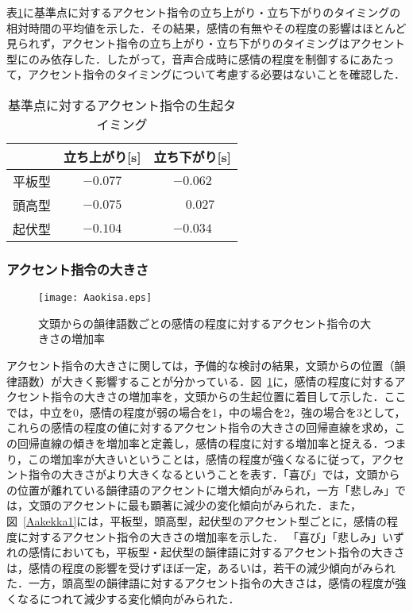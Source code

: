 \documentclass[japanese]{jnlp_1.3b}
\begin{document}
表\ref{onoffset}に基準点に対するアクセント指令の立ち上がり・立ち下がりのタイミングの相対時間の平均値を示した．その結果，感情の有無やその程度の影響はほとんど見られず，アクセント指令の立ち上がり・立ち下がりのタイミングはアクセント型にのみ依存した．したがって，音声合成時に感情の程度を制御するにあたって，アクセント指令のタイミングについて考慮する必要はないことを確認した．


\begin{table}[t]
\begin{center}
\caption{基準点に対するアクセント指令の生起タイミング}
\label{onoffset}
\begin{tabular}{lcc}
\hline
&立ち上がり[s]&立ち下がり[s]\\
\hline
平板型&$-0.077$&$-0.062$\\
頭高型&$-0.075$&$\phantom{-}0.027$\\
起伏型&$-0.104$&$-0.034$\\
\hline
\end{tabular}
\end{center}
\end{table}

\subsubsection{アクセント指令の大きさ}

\begin{figure}[b]
\begin{center}
    \texttt{[image: Aaokisa.eps]}
\end{center}
\caption{文頭からの韻律語数ごとの感情の程度に対するアクセント指令の大きさの増加率}
\label{Aakekka}
\end{figure}


アクセント指令の大きさに関しては，予備的な検討の結果，文頭からの位置（韻律語数）が大きく影響することが分かっている\cite{kw2}．図~\ref{Aakekka}に，感情の程度に対するアクセント指令の大きさの増加率を，文頭からの生起位置に着目して示した．ここでは，中立を0，感情の程度が弱の場合を1，中の場合を2，強の場合を3として，これらの感情の程度の値に対するアクセント指令の大きさの回帰直線を求め，この回帰直線の傾きを増加率と定義し，感情の程度に対する増加率と捉える．つまり，この増加率が大きいということは，感情の程度が強くなるに従って，アクセント指令の大きさがより大きくなるということを表す．「喜び」では，文頭からの位置が離れている韻律語のアクセントに増大傾向がみられ，一方「悲しみ」では，文頭のアクセントに最も顕著に減少の変化傾向がみられた．また，図~\ref{Aakekka1}には，平板型，頭高型，起伏型のアクセント型ごとに，感情の程度に対するアクセント指令の大きさの増加率を示した．
「喜び」「悲しみ」いずれの感情においても，平板型・起伏型の韻律語に対するアクセント指令の大きさは，感情の程度の影響を受けずほぼ一定，あるいは，若干の減少傾向がみられた．一方，頭高型の韻律語に対するアクセント指令の大きさは，感情の程度が強くなるにつれて減少する変化傾向がみられた．
\end{document}
